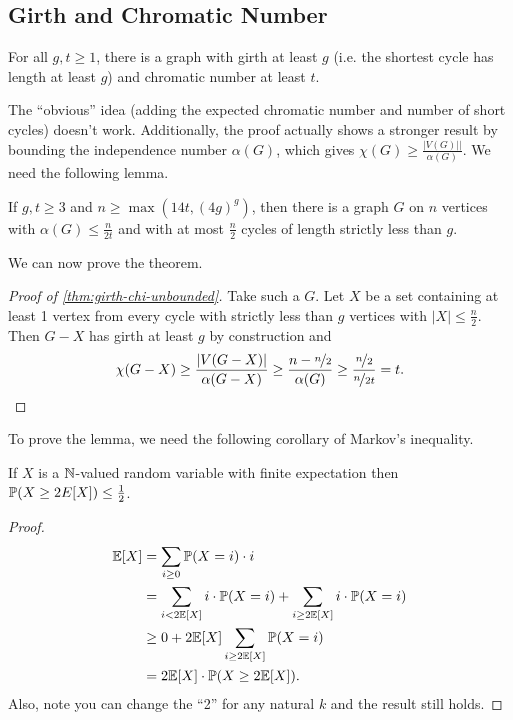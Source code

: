 \documentclass[main.tex]{subfiles}
\begin{document}
\subsection{Girth and Chromatic Number}
\begin{theorem}[Erd\H{o}s]\th\label{thm:girth-chi-unbounded}
  For all $g,t\geq 1$, there is a graph with girth at least $g$ (i.e. the
  shortest cycle has length at least $g$) and chromatic number at least $t$.
\end{theorem}
The ``obvious'' idea (adding the expected chromatic number and number
of short cycles) doesn't work.
Additionally, the proof actually shows a stronger result by bounding the
independence number $\alpha(G)$, which gives $\chi(G)\geq\frac{|V(G)||}{\alpha(G)}$.
We need the following lemma.
\begin{lemma}\th\label{lem:girth-chi-unbounded-helper}
  If $g,t\geq 3$ and $n\geq\max(14t,(4g)^g)$, then there is a graph $G$ on $n$
  vertices with $\alpha(G)\leq\frac{n}{2t}$ and with at most $\frac{n}{2}$
  cycles of length strictly less than $g$.
\end{lemma}
We can now prove the theorem.
\begin{proof}[Proof of \th\ref{thm:girth-chi-unbounded}]
  Take such a $G$.
  Let $X$ be a set containing at least 1 vertex from every cycle with strictly
  less than $g$ vertices with $|X|\leq\frac n 2$.
  Then $G - X$ has girth at least $g$ by construction and
  \[
    \chi(G-X)\geq\frac{|V(G-X)|}{\alpha(G-X)}\geq\frac{n - \nicefrac n 2}{\alpha(G)}
    \geq\frac{\nicefrac n 2}{\nicefrac n{2t}} = t. \qedhere
  \]
\end{proof}
To prove the lemma, we need the following corollary of Markov's inequality.
\begin{corollary}
  If $X$ is a $\mathbb N$-valued random variable with finite expectation then
  $\mathbb P(X\geq 2E[X])\leq\frac{1}{2}$.
\end{corollary}
\begin{proof}
  \leavevmode\vspace{-0.5em}
  \begin{align*}
    \mathbb E[X] &= \sum_{i\geq 0}\mathbb P(X=i)\cdot i \\
           &= \sum_{i < 2\mathbb E[X]}i\cdot\mathbb P(X=i) + \sum_{i\geq 2\mathbb E[X]}i\cdot\mathbb P(X=i) \\
           &\geq 0 + 2\mathbb E[X]\sum_{i\geq 2\mathbb E[X]}\mathbb P(X=i) \\
           &= 2\mathbb E[X]\cdot\mathbb P(X\geq 2\mathbb E[X]).
  \end{align*}
  Also, note you can change the ``2'' for any natural $k$ and the result still
  holds.
\end{proof}
\end{document}
